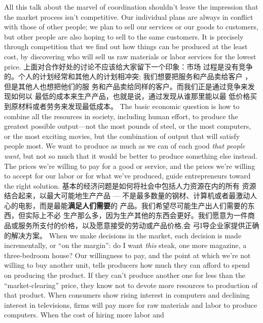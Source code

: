 \begin{paracol}{2}
All this talk about the marvel of coordination shouldn't leave
the impression that the market process isn't competitive. Our
individual plans are always in conflict with those of other people; we plan to sell our services or our goods to customers, but
other people are also hoping to sell to the same customers. It is
precisely through competition that we find out how things can
be produced at the least cost, by discovering who will sell us
raw materials or labor services for the lowest price.
\switchcolumn
上面对合作好处的讨论不应该给大家留下一个印象：市场
过程是没有竞争的。个人的计划经常和其他人的计划相冲突;
我们想要把服务和产品卖给客户 ， 但是其他人也想把他们的服
务和产品卖给同样的客户。而我们正是通过竞争来发现如何以
最低的成本来生产产品，也就是说，通过发现从谁那里能以最
低价格买到原材料或者劳务来发现最低成本。
\switchcolumn*
The basic economic question is how to combine all the resources in society, including human effort, to produce the greatest possible output---not the most pounds of steel, or the most
computers, or the most exciting movies, but the combination of
output that will satisfy people most. We want to produce as
much as we can of each good \textit{that people want}, but not so much
that it would be better to produce something else instead. The
prices we're willing to pay for a good or service, and the prices
we're willing to accept for our labor or for what we've produced, guide entrepreneurs toward the right solution.
\switchcolumn
基本的经济问题是如何将社会中包括人力资源在内的所有
资源结合起来，以最大可能地生产产品 --- 不是最多数量的钢材、计算机或者最激动人心的电影，而是最能\textbf{满足人们需要}的
产品。我们希望尽可能生产出人们需要的东西，但实际上不必
生产那么多，因为生产其他的东西会更好。我们愿意为一件商
品或服务所支付的价格，以及愿意接受的劳动或产品价格,会
弓I导企业家提供正确的解决方案。
\switchcolumn*
When we make decisions in the market, each decision is
made incrementally, or ``on the margin'': do I want \textit{this} steak,
one more magazine, a three-bedroom house? Our willingness to
pay, and the point at which we're not willing to buy another
unit, tells producers how much they can afford to spend on producing the product. If they can't produce another one for less
than the ``market-clearing'' price, they know not to devote
more resources to production of that product. When consumers
show rising interest in computers and declining interest in televisions, firms will pay more for raw materials and labor to produce computers. When the cost of hiring more labor and

\end{paracol}
